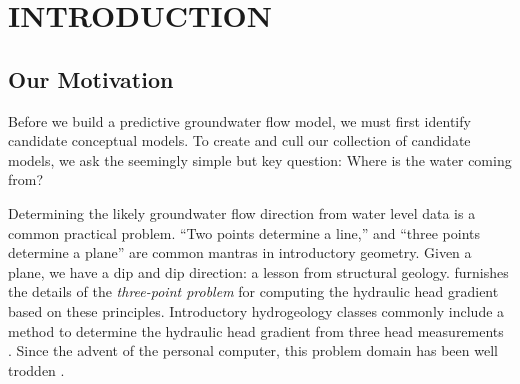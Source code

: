 \documentclass[12pt]{report}
\begin{document}
\renewcommand\contentsname{Table of Contents}   %
\tableofcontents


\listoftables


\listoffigures



\chapter{INTRODUCTION}\label{1.0.1}
\setcounter{page}{1}


\section{Our Motivation}
Before we build a predictive groundwater flow model, we must first identify candidate conceptual models. To create and cull our collection of candidate models, we ask the seemingly simple but key question: Where is the water coming from?

Determining the likely groundwater flow direction from water level data is a common practical problem. ``Two points determine a line,'' and ``three points determine a plane'' are common mantras in introductory geometry. Given a plane, we have a dip and dip direction: a lesson from structural geology. \citet{Pinder1981} furnishes the details of the {\em three-point problem} for computing the hydraulic head gradient based on these principles. Introductory hydrogeology classes commonly include a method to determine the hydraulic head gradient from three head measurements \citep[e.g.][Section 4.12]{Fetter94}. Since the advent of the personal computer, this problem domain has been well trodden \citep[e.g.][]{Kelly1989}.
\end{document}
